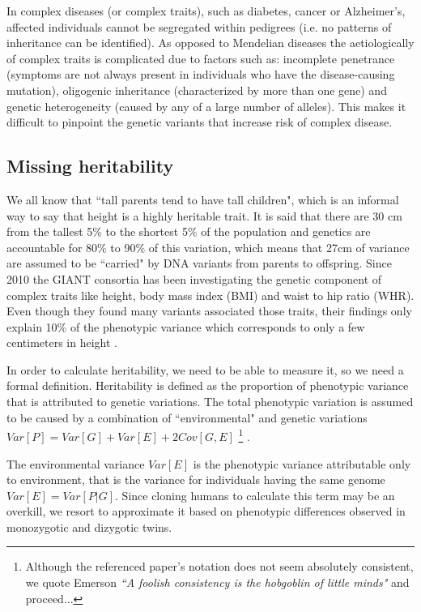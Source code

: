 In complex diseases (or complex traits), such as diabetes, cancer or Alzheimer’s, affected individuals cannot be segregated within pedigrees (i.e. no patterns of inheritance can be identified). As opposed to Mendelian diseases the aetiologically of complex traits is complicated due to factors such as: incomplete penetrance (symptoms are not always present in individuals who have the disease-causing mutation), oligogenic inheritance (characterized by more than one gene) and genetic heterogeneity (caused by any of a large number of alleles). This makes  it difficult to pinpoint the genetic variants that increase risk of complex disease.

\subsection{Missing heritability}

We all know that ``tall parents tend to have tall children", which is an informal way to say that height is a highly heritable trait. It is said that there are 30 cm from the tallest 5\% to the shortest 5\% of the population and genetics are accountable for 80\% to 90\% of this variation, which means that 27cm of variance are assumed to be ``carried" by DNA variants from parents to offspring. Since 2010 the GIANT consortia has been investigating the genetic component of complex traits like height, body mass index (BMI) and waist to hip ratio (WHR). Even though they found many variants associated those traits, their findings only explain 10\% of the phenotypic variance which corresponds to only a few centimeters in height \cite{wood2014defining}.

In order to calculate heritability, we need to be able to measure it, so we need a formal definition. Heritability is defined as the proportion of phenotypic variance that is attributed to genetic variations. The total phenotypic variation is assumed to be caused by a combination of ``environmental" and genetic variations $Var[P] = Var[G] + Var[E] + 2 Cov[G, E]$ 
\iffinal
\footnote{Although the referenced paper's notation does not seem absolutely consistent, we quote Emerson \textit{``A foolish consistency is the hobgoblin of little minds"} and proceed...}
\fi
.

The environmental variance $Var[E]$ is the phenotypic variance attributable only to environment, that is the variance for individuals having the same genome $Var[E] = Var[P|G]$. Since cloning humans to calculate this term may be an overkill, we resort to approximate it based on phenotypic differences observed in monozygotic and dizygotic twins.

